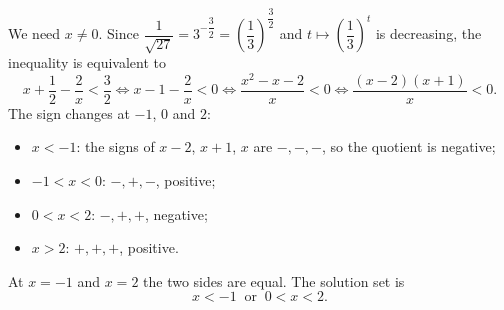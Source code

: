 We need $x\ne0$. Since $\dfrac{1}{\sqrt{27}}=3^{-\dfrac32}=\left(\dfrac13\right)^{\dfrac32}$ and $t\mapsto\left(\dfrac13\right)^t$ is decreasing, the inequality is equivalent to
\[x+\dfrac12-\dfrac2x<\dfrac32\iff x-1-\dfrac2x<0\iff\dfrac{x^2-x-2}{x}<0\iff\dfrac{(x-2)(x+1)}{x}<0.\]
The sign changes at $-1$, $0$ and $2$:
\begin{itemize}
\item $x<-1$: the signs of $x-2$, $x+1$, $x$ are $-,-,-$, so the quotient is negative;
\item $-1<x<0$: $-,+,-$, positive;
\item $0<x<2$: $-,+,+$, negative;
\item $x>2$: $+,+,+$, positive.
\end{itemize}
At $x=-1$ and $x=2$ the two sides are equal. The solution set is
\[\boxed{x<-1\ \text{ or }\ 0<x<2}.\]

